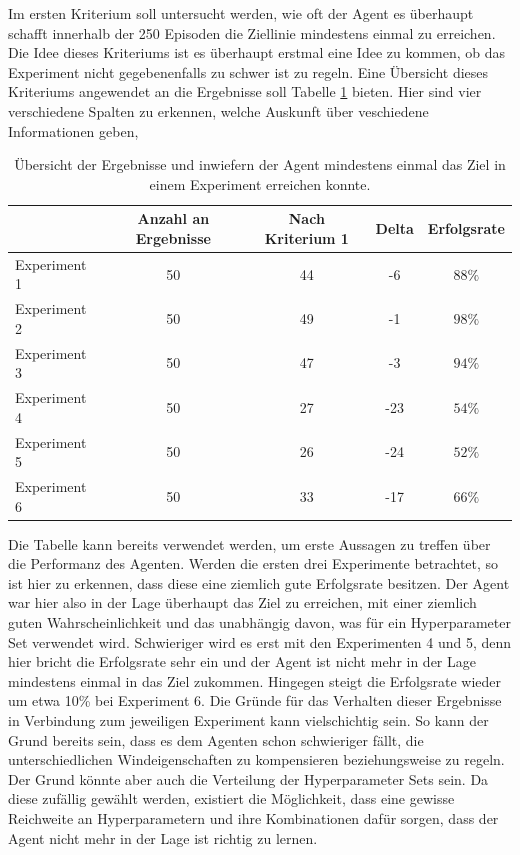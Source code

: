 \documentclass[]{iat}
\begin{document}
Im ersten Kriterium soll untersucht werden, wie oft der Agent es überhaupt schafft innerhalb der 250 Episoden die Ziellinie mindestens einmal zu erreichen. Die Idee dieses Kriteriums ist es überhaupt erstmal eine Idee zu kommen, ob das Experiment nicht gegebenenfalls zu schwer ist zu regeln. Eine Übersicht dieses Kriteriums angewendet an die Ergebnisse soll Tabelle \ref{tab:crit1} bieten. Hier sind vier verschiedene Spalten zu erkennen, welche Auskunft über veschiedene Informationen geben,
\begin{table}[H]
    \begin{tabular}{l|c|c|c|c}
                     & Anzahl an Ergebnisse & Nach Kriterium 1 & Delta & Erfolgsrate \\ \hline
        Experiment 1 & 50                   & 44               & -6    & $88\%$      \\ \hline
        Experiment 2 & 50                   & 49               & -1    & $98\%$      \\ \hline
        Experiment 3 & 50                   & 47               & -3    & $94\%$      \\ \hline
        Experiment 4 & 50                   & 27               & -23   & $54\%$      \\ \hline
        Experiment 5 & 50                   & 26               & -24   & $52\%$      \\ \hline
        Experiment 6 & 50                   & 33               & -17   & $66\%$
    \end{tabular}
    \caption{Übersicht der Ergebnisse und inwiefern der Agent mindestens einmal das Ziel in einem Experiment erreichen konnte.}
    \label{tab:crit1}
\end{table}
Die Tabelle kann bereits verwendet werden, um erste Aussagen zu treffen über die Performanz des Agenten. Werden die ersten drei Experimente betrachtet, so ist hier zu erkennen, dass diese eine ziemlich gute Erfolgsrate besitzen. Der Agent war hier also in der Lage überhaupt das Ziel zu erreichen, mit einer ziemlich guten Wahrscheinlichkeit und das unabhängig davon, was für ein Hyperparameter Set verwendet wird. Schwieriger wird es erst mit den Experimenten 4 und 5, denn hier bricht die Erfolgsrate sehr ein und der Agent ist nicht mehr in der Lage mindestens einmal in das Ziel zukommen. Hingegen steigt die Erfolgsrate wieder um etwa 10\% bei Experiment 6. Die Gründe für das Verhalten dieser Ergebnisse in Verbindung zum jeweiligen Experiment kann vielschichtig sein. So kann der Grund bereits sein, dass es dem Agenten schon schwieriger fällt, die unterschiedlichen Windeigenschaften zu kompensieren beziehungsweise zu regeln. Der Grund könnte aber auch die Verteilung der Hyperparameter Sets sein. Da diese zufällig gewählt werden, existiert die Möglichkeit, dass eine gewisse Reichweite an Hyperparametern und ihre Kombinationen dafür sorgen, dass der Agent nicht mehr in der Lage ist richtig zu lernen.
\end{document}
